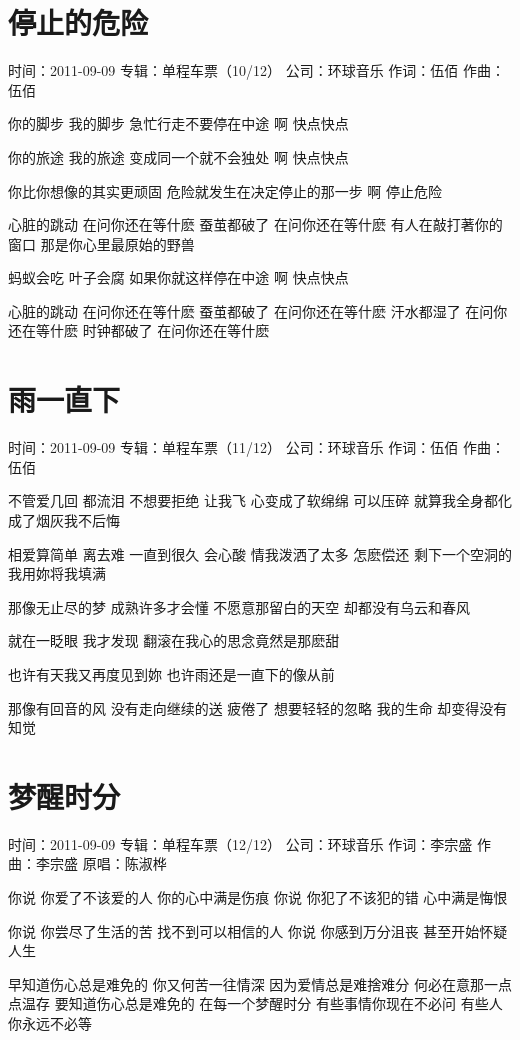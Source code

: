 \documentclass[UTF8,a4paper,oneside,twocolumn,12pt]{ctexbook}
\newcommand{\infopair}[2]{\textbullet #1：#2}
\newcommand{\zc}[1][伍佰]{\infopair{作词}{#1}}
\newcommand{\zq}[1][伍佰]{\infopair{作曲}{#1}}
\newcommand{\zj}[1]{\infopair{专辑}{#1}}
\newcommand{\yc}[1]{\infopair{原唱}{#1}}
\newcommand{\sj}[1]{\infopair{时间}{#1}}
\newcommand{\gs}[1]{\infopair{公司}{#1}}
\newenvironment{info}{\begin{flushleft}\kaishu
	}
	{\end{flushleft}\normalsize\yahei\par}
\newenvironment{lyric}{
	}
{}
\begin{document}
\section{停止的危险}
\begin{info}
	\sj{2011-09-09}
	\zj{单程车票（10/12）}
	\gs{环球音乐}
	\zc
	\zq
\end{info}
\begin{lyric}
	你的脚步 我的脚步
	急忙行走不要停在中途
	啊 快点快点

	你的旅途 我的旅途
	变成同一个就不会独处
	啊 快点快点

	你比你想像的其实更顽固
	危险就发生在决定停止的那一步
	啊 停止危险

	心脏的跳动 在问你还在等什麽
	蚕茧都破了 在问你还在等什麽
	有人在敲打著你的窗口
	那是你心里最原始的野兽

	蚂蚁会吃 叶子会腐
	如果你就这样停在中途
	啊 快点快点

	心脏的跳动 在问你还在等什麽
	蚕茧都破了 在问你还在等什麽
	汗水都湿了 在问你还在等什麽
	时钟都破了 在问你还在等什麽
\end{lyric}

\section{雨一直下}
\begin{info}
	\sj{2011-09-09}
	\zj{单程车票（11/12）}
	\gs{环球音乐}
	\zc
	\zq
\end{info}
\begin{lyric}
	不管爱几回 都流泪
	不想要拒绝 让我飞
	心变成了软绵绵 可以压碎
	就算我全身都化成了烟灰我不后悔

	相爱算简单 离去难
	一直到很久 会心酸
	情我泼洒了太多 怎麽偿还
	剩下一个空洞的我用妳将我填满

	那像无止尽的梦
	成熟许多才会懂
	不愿意那留白的天空
	却都没有乌云和春风

	就在一眨眼 我才发现
	翻滚在我心的思念竟然是那麽甜

	也许有天我又再度见到妳
	也许雨还是一直下的像从前

	那像有回音的风
	没有走向继续的送
	疲倦了 想要轻轻的忽略
	我的生命 却变得没有知觉
\end{lyric}

\section{梦醒时分}
\begin{info}
	\sj{2011-09-09}
	\zj{单程车票（12/12）}
	\gs{环球音乐}
	\zc[李宗盛]
	\zq[李宗盛]
	\yc{陈淑桦}
\end{info}
\begin{lyric}
	你说 你爱了不该爱的人 你的心中满是伤痕
	你说 你犯了不该犯的错 心中满是悔恨

	你说 你尝尽了生活的苦 找不到可以相信的人
	你说 你感到万分沮丧 甚至开始怀疑人生

	早知道伤心总是难免的 你又何苦一往情深
	因为爱情总是难捨难分 何必在意那一点点温存
	要知道伤心总是难免的 在每一个梦醒时分
	有些事情你现在不必问 有些人你永远不必等
\end{lyric}
\end{document}
